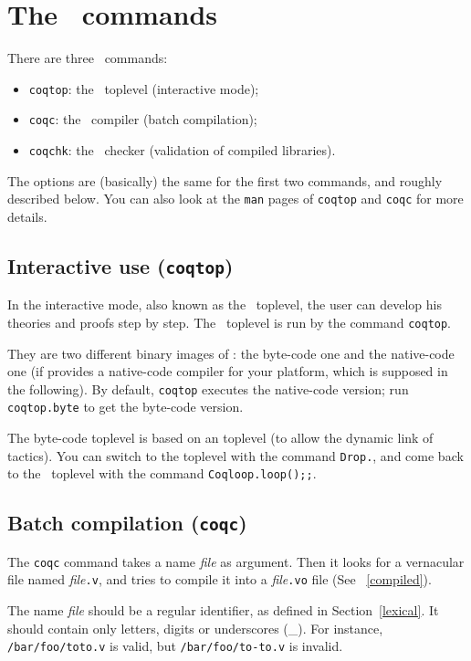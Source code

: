 \chapter[The \Coq~commands]{The \Coq~commands\label{Addoc-coqc}
}

There are three \Coq~commands: 
\begin{itemize}
\item {\tt coqtop}: the \Coq\ toplevel (interactive mode);
\item {\tt coqc}: the \Coq\ compiler (batch compilation);
\item {\tt coqchk}: the \Coq\ checker (validation of compiled libraries).
\end{itemize}
The options are (basically) the same for the first two commands, and
roughly described below. You can also look at the \verb!man! pages of
\verb!coqtop! and \verb!coqc! for more details.


\section{Interactive use ({\tt coqtop})}

In the interactive mode, also known as the \Coq~toplevel, the user can
develop his theories and proofs step by step.  The \Coq~toplevel is
run by the command {\tt coqtop}. 

\label{binary-images}
They are two different binary images of \Coq: the byte-code one and
the native-code one (if {\ocaml} provides a native-code compiler
for your platform, which is supposed in the following). By default,
\verb!coqtop! executes the native-code version; run \verb!coqtop.byte! to
get the byte-code version.

The byte-code toplevel is based on an {\ocaml}
toplevel (to allow the dynamic link of tactics).  You can switch to
the {\ocaml} toplevel with the command \verb!Drop.!, and come back to the
\Coq~toplevel with the command \verb!Coqloop.loop();;!.

\section{Batch compilation ({\tt coqc})}
The {\tt coqc} command takes a name {\em file} as argument.  Then it
looks for a vernacular file named {\em file}{\tt .v}, and tries to
compile it into a {\em file}{\tt .vo} file (See ~\ref{compiled}).

\Warning The name {\em file} should be a regular {\Coq} identifier, as
defined in Section~\ref{lexical}. It should contain only letters, digits
or underscores (\_). For instance, \verb+/bar/foo/toto.v+ is valid, but
\verb+/bar/foo/to-to.v+ is invalid.

